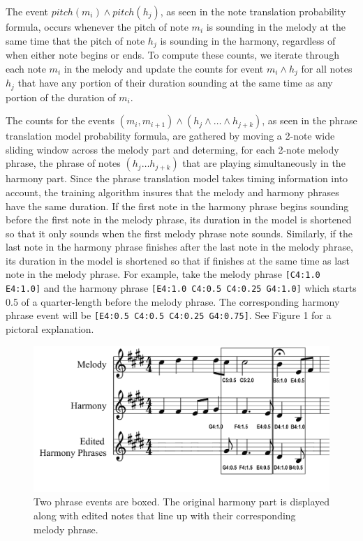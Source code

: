 \documentclass{sig-alternate}
\begin{document}
The event $pitch(m_{i}) \wedge pitch(h_{j})$, as seen in the note translation probability formula, occurs whenever the pitch of note $m_{i}$ is sounding in the melody at the same time that the pitch of note $h_{j}$ is sounding in the harmony, regardless of when either note begins or ends. To compute these counts, we iterate through each note $m_{i}$ in the melody and update the counts for event $m_{i} \wedge h_{j}$ for all notes $h_{j}$ that have any portion of their duration sounding at the same time as any portion of the duration of $m_{i}$.

The counts for the events $(m_{i}, m_{i+1}) \wedge (h_{j} \wedge \ldots \wedge h_{j+k})$, as seen in the phrase translation model probability formula, are gathered by moving a 2-note wide sliding window across the melody part
and determing, for each 2-note melody phrase, the phrase of notes $(h_{j} \ldots h_{j + k})$ that are playing simultaneously in the harmony part. Since the phrase translation model takes timing information into account, the training algorithm insures that the melody and harmony phrases have the same duration. If the first note in the harmony phrase begins sounding before the first note in the melody phrase, its duration in the model is shortened so that it only sounds when the first melody phrase note sounds. Similarly, if the last note in the harmony phrase finishes after the last note in the melody phrase, its duration in the model is shortened so that if finishes at the same time as last note in the melody phrase. For example, take the melody phrase \texttt{[C4:1.0 E4:1.0]} and the harmony phrase \texttt{[E4:1.0 C4:0.5 C4:0.25 G4:1.0]} which starts 0.5 of a quarter-length before the melody phrase. The corresponding harmony phrase event will be \texttt{[E4:0.5 C4:0.5 C4:0.25 G4:0.75]}. See Figure 1 for a pictoral explanation.

\begin{figure}
	\includegraphics[scale=0.08]{./phrase_examples.png}
	\caption{Two phrase events are boxed. The original harmony part is displayed along with edited notes that line up with their corresponding melody phrase.}
\end{figure} 
\end{document}
